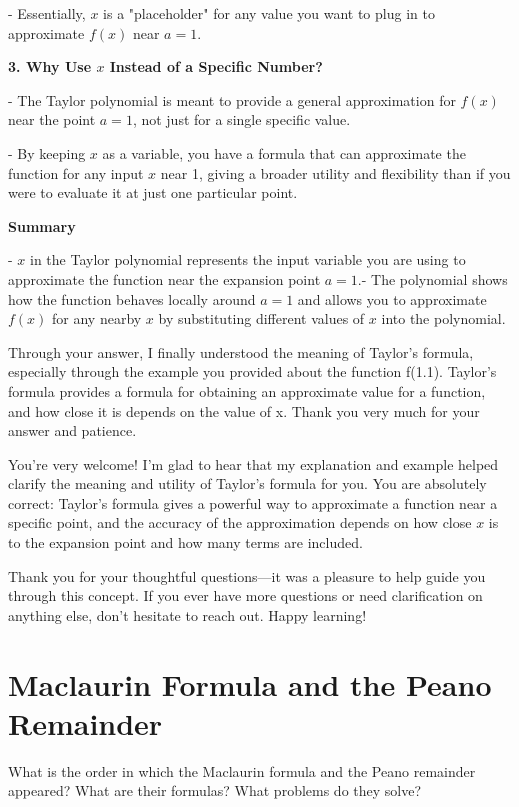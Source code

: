 \documentclass[a4paper,12pt]{book}
\begin{document}
- Essentially, \( x \) is a "placeholder" for any value you want to plug in to approximate \( f(x) \) near \( a = 1 \).

\textbf{3. Why Use \( x \) Instead of a Specific Number?}


- The Taylor polynomial is meant to provide a general approximation for \( f(x) \) near the point \( a = 1 \), not just for a single specific value.

- By keeping \( x \) as a variable, you have a formula that can approximate the function for any input \( x \) near 1, giving a broader utility and flexibility than if you were to evaluate it at just one particular point.

\textbf{Summary}

- \( x \) in the Taylor polynomial represents the input variable you are using to approximate the function near the expansion point \( a = 1 \).- The polynomial shows how the function behaves locally around \( a = 1 \) and allows you to approximate \( f(x) \) for any nearby \( x \) by substituting different values of \( x \) into the polynomial.

\begin{bluebox}
Through your answer, I finally understood the meaning of Taylor's formula, especially through the example you provided about the function f(1.1). Taylor's formula provides a formula for obtaining an approximate value for a function, and how close it is depends on the value of x. Thank you very much for your answer and patience.
\end{bluebox}

You're very welcome! I'm glad to hear that my explanation and example helped clarify the meaning and utility of Taylor's formula for you. You are absolutely correct: Taylor’s formula gives a powerful way to approximate a function near a specific point, and the accuracy of the approximation depends on how close \( x \) is to the expansion point and how many terms are included.

Thank you for your thoughtful questions—it was a pleasure to help guide you through this concept. If you ever have more questions or need clarification on anything else, don't hesitate to reach out. Happy learning!

\section{Maclaurin Formula and the Peano Remainder}

\begin{bluebox}
What is the order in which the Maclaurin formula and the Peano remainder appeared? What are their formulas? What problems do they solve?
\end{bluebox}
\end{document}
